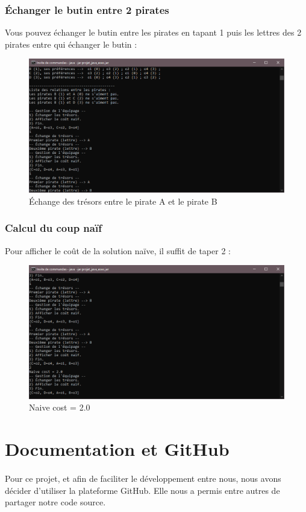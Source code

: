 \documentclass[12pt]{article}
\begin{document}
\subsubsection{Échanger le butin entre 2 pirates}
Vous pouvez échanger le butin entre les pirates en tapant 1 puis les lettres des 2 pirates entre qui échanger le butin :
\begin{figure}[H]
\includegraphics[width=16cm]{swap}
\centering
\caption{Échange des trésors entre le pirate A et le pirate B}
\end{figure}
\subsubsection{Calcul du coup naïf}
Pour afficher le coût de la solution naïve, il suffit de taper 2 :
\begin{figure}[H]
\includegraphics[width=16cm]{naive_cost}
\centering
\caption{Naive cost = 2.0}
\end{figure}
\section{Documentation et GitHub}
\paragraph{} Pour ce projet, et afin de faciliter le développement entre nous, nous avons décider d'utiliser la plateforme GitHub.
Elle nous a permis entre autres de partager notre code source.
\end{document}
